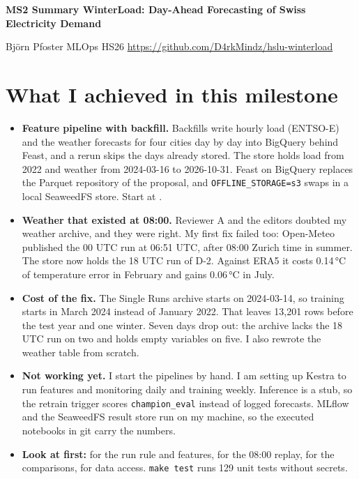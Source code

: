 \documentclass[10pt,a4paper]{article}
\begin{document}
\small

{\raggedright\Large\bfseries MS2 Summary \textperiodcentered{} WinterLoad: Day-Ahead Forecasting of Swiss Electricity Demand\par}
\vspace{2pt}
Björn Pfoster \textperiodcentered{} MLOps HS26 \textperiodcentered{} \url{https://github.com/D4rkMindz/hslu-winterload}

\section{What I achieved in this milestone}
\begin{itemize}
  \item \textbf{Feature pipeline with backfill.} Backfills write hourly load (ENTSO-E) and the weather forecasts for four
        cities day by day into BigQuery behind Feast, and a rerun skips the days already stored. The store holds load from
        2022 and weather from 2024-03-16 to 2026-10-31. Feast on BigQuery replaces the Parquet repository of the proposal,
        and \texttt{OFFLINE\_STORAGE=s3} swaps in a local SeaweedFS store.
        Start at .
  \item \textbf{Weather that existed at 08:00.} Reviewer A and the editors doubted my weather archive, and they were right.
        My first fix failed too: Open-Meteo published the 00 UTC run at 06:51 UTC, after 08:00 Zurich time in summer.
        The store now holds the 18 UTC run of D-2. Against ERA5 it costs 0.14\,°C of temperature error in February and
        gains 0.06\,°C in July.
  \item \textbf{Cost of the fix.} The Single Runs archive starts on 2024-03-14, so training starts in March 2024 instead of
        January 2022. That leaves 13,201 rows before the test year and one winter. Seven days drop out: the archive lacks
        the 18 UTC run on two and holds empty variables on five. I also rewrote the weather table from scratch.
  \item \textbf{Not working yet.} I start the pipelines by hand. I am setting up Kestra to run features and monitoring daily
        and training weekly.
        Inference is a stub, so the retrain trigger scores \texttt{champion\_eval} instead of logged forecasts. MLflow
        and the SeaweedFS result store run on my machine, so the executed notebooks in git carry the numbers.
  \item \textbf{Look at first:}  for the run rule and features,
         for the 08:00 replay,  for the
        comparisons,  for data access. \texttt{make test} runs 129 unit tests without secrets.
\end{itemize}
\end{document}
